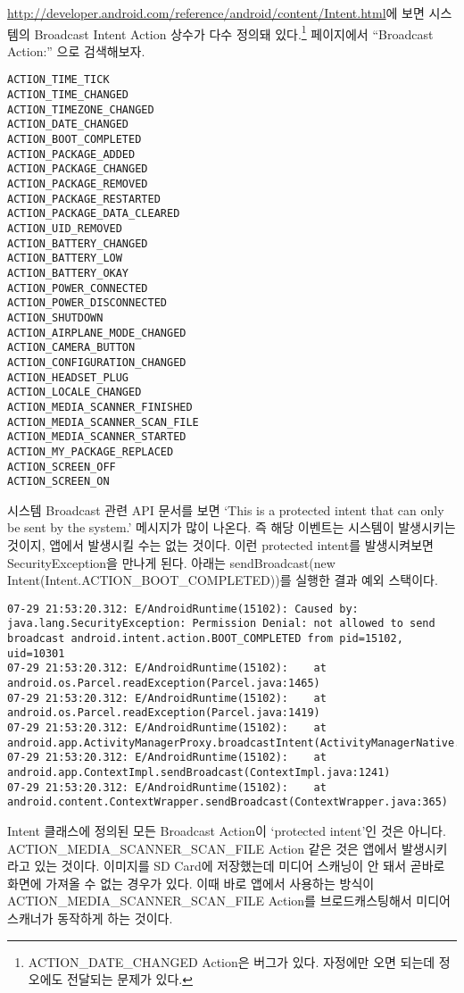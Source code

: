 \url{http://developer.android.com/reference/android/content/Intent.html}에 보면 시스템의 Broadcast Intent Action 상수가 다수 정의돼 있다.\footnote{ACTION\_DATE\_CHANGED Action은 버그가 있다. 자정에만 오면 되는데 정오에도 전달되는 문제가 있다.
} 페이지에서 ``Broadcast Action:'' 으로 검색해보자.

\begin{verbatim}
ACTION_TIME_TICK
ACTION_TIME_CHANGED
ACTION_TIMEZONE_CHANGED
ACTION_DATE_CHANGED
ACTION_BOOT_COMPLETED
ACTION_PACKAGE_ADDED
ACTION_PACKAGE_CHANGED
ACTION_PACKAGE_REMOVED
ACTION_PACKAGE_RESTARTED
ACTION_PACKAGE_DATA_CLEARED
ACTION_UID_REMOVED
ACTION_BATTERY_CHANGED
ACTION_BATTERY_LOW
ACTION_BATTERY_OKAY
ACTION_POWER_CONNECTED
ACTION_POWER_DISCONNECTED
ACTION_SHUTDOWN
ACTION_AIRPLANE_MODE_CHANGED
ACTION_CAMERA_BUTTON
ACTION_CONFIGURATION_CHANGED
ACTION_HEADSET_PLUG
ACTION_LOCALE_CHANGED
ACTION_MEDIA_SCANNER_FINISHED
ACTION_MEDIA_SCANNER_SCAN_FILE
ACTION_MEDIA_SCANNER_STARTED
ACTION_MY_PACKAGE_REPLACED
ACTION_SCREEN_OFF
ACTION_SCREEN_ON
\end{verbatim}

시스템 Broadcast 관련 API 문서를 보면 `This is a protected intent that can only be sent by the system.' 메시지가 많이 나온다. 즉 해당 이벤트는 시스템이 발생시키는 것이지, 앱에서 발생시킬 수는 없는 것이다.
이런 protected intent를 발생시켜보면 SecurityException을 만나게 된다. 아래는 
sendBroadcast(new Intent(Intent.ACTION\_BOOT\_COMPLETED))를 실행한 결과 예외 스택이다.
\begin{lstlisting}[frame=single] 
07-29 21:53:20.312: E/AndroidRuntime(15102): Caused by: java.lang.SecurityException: Permission Denial: not allowed to send broadcast android.intent.action.BOOT_COMPLETED from pid=15102, uid=10301
07-29 21:53:20.312: E/AndroidRuntime(15102): 	at android.os.Parcel.readException(Parcel.java:1465)
07-29 21:53:20.312: E/AndroidRuntime(15102): 	at android.os.Parcel.readException(Parcel.java:1419)
07-29 21:53:20.312: E/AndroidRuntime(15102): 	at android.app.ActivityManagerProxy.broadcastIntent(ActivityManagerNative.java:2430)
07-29 21:53:20.312: E/AndroidRuntime(15102): 	at android.app.ContextImpl.sendBroadcast(ContextImpl.java:1241)
07-29 21:53:20.312: E/AndroidRuntime(15102): 	at android.content.ContextWrapper.sendBroadcast(ContextWrapper.java:365)
\end{lstlisting}

Intent 클래스에 정의된 모든 Broadcast Action이 `protected intent'인 것은 아니다.
ACTION\_MEDIA\_SCANNER\_SC\-AN\_FI\-LE Action 같은 것은 앱에서 발생시키라고 있는 것이다.
이미지를 SD Card에 저장했는데 미디어 스캐닝이 안 돼서 곧바로 화면에 가져올 수 없는 경우가 있다.
이때 바로 앱에서 사용하는 방식이 ACTION\_MEDIA\_SCANNER\_SCAN\_FILE Action를 브로드캐스팅해서 미디어 스캐너가 동작하게 하는 것이다.\\

